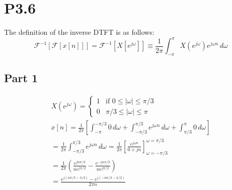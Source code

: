 \documentclass{article}
\begin{document}
\section*{P3.6}
The definition of the inverse DTFT is as follows:
\begin{equation}
    \mathcal{F}^{-1}[\mathcal{F}[x[n]]] = \mathcal{F}^{-1}\left[X\left[e^{j\omega}\right]\right] \equiv \frac1{2\pi} \int_{-\pi}^\pi X\left(e^{j\omega}\right)e^{j\omega n}\,d\omega
\end{equation}

\subsection*{Part 1}
\begin{gather*}
    X\left(e^{j\omega}\right) =
    \begin{cases}
        1 & \text{if } 0 \le |\omega| \le \pi/3\\
        0 & \pi/3 \le |\omega| \le \pi
    \end{cases}\\
    x[n] = \frac{1}{2\pi} \left[ \int_{-\pi}^{-\pi/3}0\,d\omega + \int_{-\pi/3}^{\pi/3}e^{j\omega n}\,d\omega + \int_{\pi/3}^\pi 0\,d\omega \right]\\
    = \frac{1}{2\pi} \int_{-\pi/3}^{\pi/3}e^{j\omega n}\,d\omega = \frac{1}{2\pi} \left[\frac{e^{j\omega n}}{0+jn}\right]_{\omega = -\pi/3}^{\omega = \pi/3} \\
    = \frac{1}{2\pi} \left( \frac{e^{jn\pi/3}}{ne^{j\pi/2}} - \frac{e^{-jn\pi/3}}{ne^{j\pi/2}} \right)\\
    = \frac{e^{j\left(n\pi/3 - \pi/2\right)} - e^{j\left(-n\pi/3 - \pi/2\right)}}{2\pi n}
\end{gather*}
\end{document}

